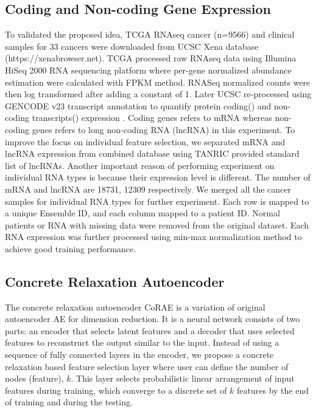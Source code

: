 \documentclass{bioinfo}
\begin{document}
\subsection{Coding and Non-coding Gene Expression}
To validated the proposed idea, TCGA RNAseq cancer (n=9566) and clinical samples for 33 cancers were downloaded from UCSC Xena database (https://xenabrowser.net). TCGA processed raw RNAseq data using Illumina HiSeq 2000 RNA sequencing platform where per-gene normalized abundance estimation were calculated with FPKM method. RNASeq normalized counts were then log transformed after adding a constant of 1. Later UCSC re-processed using GENCODE v23 transcript annotation to quantify protein coding() and non-coding transcripts() expression \citep{harrow2006gencode}. Coding genes refers to mRNA whereas non-coding genes refers to long non-coding RNA (lncRNA) in this experiment. To improve the focus on individual feature selection, we separated mRNA and lncRNA expression from combined database using TANRIC \citep{li2015tanric} provided standard list of lncRNAs. Another important reason of performing experiment on individual RNA types is because their expression level is different. The number of mRNA and lncRNA are 18731, 12309 respectively. We merged all the cancer samples for individual RNA types for further experiment. Each row is mapped to a unique Ensemble ID, and each column mapped to a patient ID. Normal patients or RNA with missing data were removed from the original dataset. Each RNA expression was further processed using min-max normalization method to achieve good training performance. 

\subsection{Concrete Relaxation Autoencoder} \label{CoRAE}
The concrete relaxation autoencoder CoRAE is a variation of original autoencoder AE \citep{hinton2006reducing} for dimension reduction. It is a neural network consists of two parts: an encoder that selects latent features and a decoder that uses selected features to reconstruct the output similar to the input. Instead of using a sequence of fully connected layers in the encoder,  we propose a concrete relaxation based feature selection layer where user can define the number of nodes (feature), $k$. This layer selects probabilistic linear arrangement of input features during training, which converge to a discrete set of $k$ features by the end of training and during the testing. 
\end{document}
